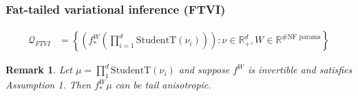 \documentclass{beamer}
\newcommand{\RR}{\mathbb{R}}
\newcommand{\cQ}{\mathcal{Q}}
\newtheorem{remark}[theorem]{Remark}
\begin{document}
\begin{frame}
    \frametitle{Fat-tailed variational inference (FTVI)}

    \begin{definition}
        \begin{align*}
            \cQ_{FTVI} & = \left\{
            \left(f^W_\ast \left(\prod_{i=1}^d \text{StudentT}(\nu_i)\right)\right):
            \nu \in \RR_+^d, W \in \RR^{\text{\# NF params}}
            \right\}
        \end{align*}
    \end{definition}

    \begin{remark}
        Let $\mu = \prod_1^d \text{StudentT}(\nu_i)$
        and suppose $f^W$ is invertible and satisfies Assumption 1.
        Then $f^W_* \mu$ can be tail anisotropic.
    \end{remark}

\end{frame}
\end{document}
